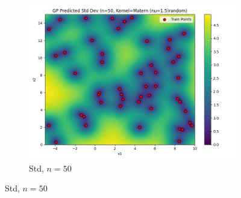 \documentclass[a4paper,12pt]{article}
\begin{document}
\begin{figure}[H]
\begin{subfigure}{0.3\textwidth}
    \includegraphics[width=\linewidth]{Task-02/images/gp_std_matern_n50_random.png}
    \caption{Std, $n=50$}
\end{subfigure}


\end{figure}
\end{document}
